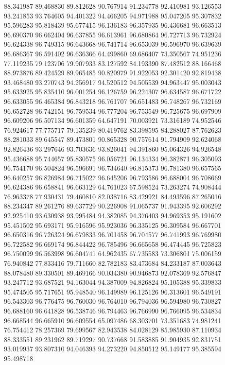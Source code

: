 88.341987
89.468830
89.812628
90.767914
91.234778
92.410981
93.126553
93.241853
93.764605
94.401322
94.466205
94.971988
95.047205
95.307832
95.596283
95.818439
95.677415
96.136183
96.357935
96.436681
96.663513
96.690370
96.662404
96.637855
96.613961
96.680864
96.727713
96.732924
96.624338
96.749315
96.643668
96.741714
96.653039
96.596970
96.639639
96.686367
96.591402
96.636366
64.499860
69.686407
73.350567
74.951236
77.119235
79.123706
79.907933
83.127592
84.193390
87.482512
88.166468
88.973876
89.424529
89.965485
90.820979
91.922053
92.301420
92.819438
93.468480
93.270743
94.256917
94.520512
94.505539
94.963447
95.003043
95.633925
95.835410
96.001254
96.126759
96.224307
96.634587
96.671722
96.633055
96.465384
96.843218
96.761707
96.651483
96.748267
96.732169
96.652728
96.742151
96.759534
96.777204
96.753549
96.725675
96.697909
96.609206
96.507134
96.601359
64.647191
70.003921
73.316189
74.952546
76.924617
77.775717
79.135239
80.419762
83.398595
84.288027
87.762623
88.281033
89.645547
89.473801
90.865328
90.757614
91.794909
92.624068
92.826436
93.297646
93.703636
93.826041
94.391860
95.064326
94.926548
95.436688
95.744657
95.830575
96.056721
96.134334
96.382871
96.305093
96.754170
96.504824
96.596691
96.734640
96.815373
96.781380
96.657565
96.640257
96.826984
96.715027
96.645206
96.793586
96.688004
96.708669
96.624386
96.658841
96.663129
64.761023
67.598524
73.263274
74.908444
76.963378
77.930431
79.460810
82.038716
83.429921
84.493596
87.265016
88.234347
89.261276
89.637729
90.226908
91.065737
91.943395
92.606292
92.925410
93.630938
93.995484
94.382085
94.376403
94.969353
95.191602
95.451502
95.693171
95.916596
95.923036
96.335125
96.309584
96.667701
96.650316
96.726324
96.679833
96.701458
96.704577
96.741993
96.769980
96.722582
96.669174
96.844422
96.785496
96.665658
96.474445
96.725823
96.750099
96.563998
96.604741
64.962435
67.735583
73.306801
75.006159
76.940842
77.833416
79.711660
82.782183
83.473684
84.233187
87.003643
88.078480
89.330501
89.469166
90.034380
90.946873
92.078369
92.576847
93.247712
93.687521
94.163044
94.387009
94.826824
95.105388
95.339833
95.474505
95.717651
95.948540
96.149989
96.125126
96.313601
96.549191
96.543303
96.776475
96.760030
96.764010
96.794036
96.594980
96.730827
96.688160
96.641828
96.538746
96.794463
96.766990
96.766095
96.534834
96.668544
96.665910
96.609554
65.097486
68.303701
73.351683
74.981241
76.754412
78.257369
79.699567
82.943538
84.028129
85.985930
87.110934
88.333551
89.231962
89.719297
90.737668
91.583885
91.904935
92.831751
93.019937
93.807310
94.046393
94.273220
94.850512
95.149177
95.385594
95.498718
